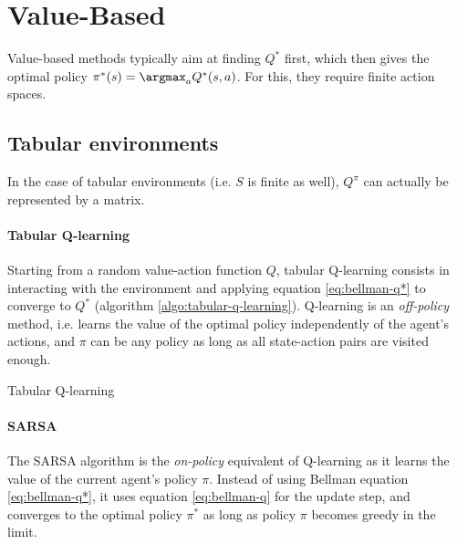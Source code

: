 \section{Value-Based}
\label{section:value-based}
Value-based methods typically aim at finding $Q^*$ first, which then gives the optimal policy $\pi^*(s) = \argmax_a Q^*(s,a)$. For this, they require finite action spaces.

\subsection{Tabular environments}
In the case of tabular environments (i.e. $S$ is finite as well), $Q^\pi$ can actually be represented by a matrix.

\paragraph{Tabular Q-learning}
Starting from a random value-action function $Q$, tabular Q-learning consists in interacting with the environment and applying equation \ref{eq:bellman-q*} to converge to $Q^*$ (algorithm \ref{algo:tabular-q-learning}). Q-learning is an \emph{off-policy} method, i.e. learns the value of the optimal policy independently of the agent's actions, and $\pi$ can be any policy as long as all state-action pairs are visited enough.

\begin{algorithm}[H]
\DontPrintSemicolon
{}
\caption{Tabular Q-learning}
\label{algo:tabular-q-learning}
\end{algorithm}

\paragraph{SARSA} The SARSA algorithm is the \emph{on-policy} equivalent of Q-learning as it learns the value of the current agent's policy $\pi$. Instead of using Bellman equation \ref{eq:bellman-q*}, it uses equation \ref{eq:bellman-q} for the update step, and converges to the optimal policy $\pi^*$ as long as policy $\pi$ becomes greedy in the limit.

